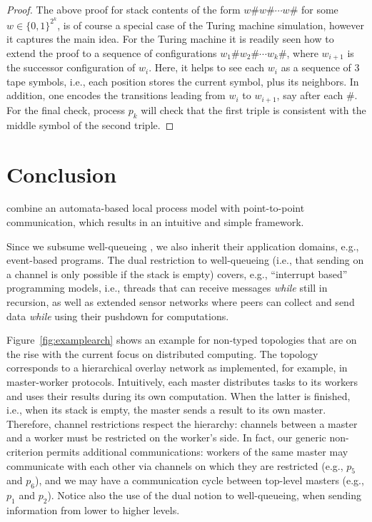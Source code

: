 \documentclass{LMCS}
\begin{document}
\begin{proof}
The above proof for stack contents of the form $w\# w\# \cdots
    w\#$ for some $w \in \{0,1\}^{2^k}$, is of course a special
    case of the Turing machine simulation, however it captures the
    main idea. For the Turing machine it is readily seen how to extend
    the proof to a sequence of configurations $w_1\# w_2\# \cdots
    w_k\#$, where $w_{i+1}$ is the successor configuration of
    $w_i$. Here, it helps to see each $w_i$ as a sequence of 3 tape symbols,
    i.e., each position stores the current symbol, plus its
    neighbors. In addition, one encodes the transitions leading from
    $w_i$ to $w_{i+1}$, say after each $\#$. For the final check, 
    process $p_k$ will check  that the first triple is consistent with the
    middle symbol of the second triple.
\end{proof}








 
\section{Conclusion}

\qcp combine an automata-based local process model with point-to-point
communication, which results
in an intuitive and simple framework.


Since we subsume well-queueing \rqcp, we also inherit their
application domains, e.g., event-based programs. The dual restriction
to well-queueing (i.e., that sending on a channel is only possible if
the stack is empty) covers, e.g., ``interrupt based'' programming
models, i.e., threads that can receive messages \emph{while} still in
recursion, as well as extended sensor networks where peers can
collect and send data \emph{while} using their pushdown for
computations.

Figure~\ref{fig:examplearch} shows an example for non-\converging typed
topologies that are on the rise with the current focus on distributed
computing. The topology corresponds to a hierarchical overlay network as
implemented, for example, in master-worker protocols.
Intuitively, each master distributes tasks to its workers and uses their
results during its own computation.
When the latter is finished, i.e., when its stack is empty, the master
sends a result to its own master.
Therefore, channel restrictions respect the hierarchy: channels between
a master and a worker must be restricted on the worker's side.
In fact, our generic non-\convergence criterion permits additional
communications: workers of the same master may communicate
with each other via channels on which they are restricted (e.g.,
$p_5$ and $p_6$),
and we may have a communication cycle between top-level masters
(e.g., $p_1$ and $p_2$).
Notice also the use of the dual notion to well-queueing, when
sending information from lower to higher
levels. 
\end{document}
